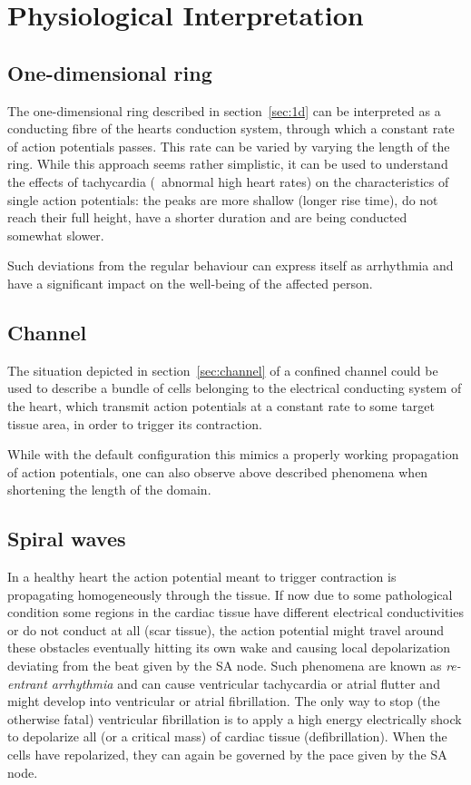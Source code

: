 \section{Physiological Interpretation}
\label{sec:phys}
\subsection{One-dimensional ring}
The one-dimensional ring described in section~\ref{sec:1d} can be interpreted
as a conducting fibre of the hearts conduction system, through which a constant
rate of action potentials passes. This rate can be varied by varying the length
of the ring. While this approach seems rather simplistic, it can be used to
understand the effects of tachycardia (\ie~abnormal high heart rates) on the
characteristics of single action potentials: the peaks are more shallow (longer
rise time), do not reach their full height, have a shorter duration and are
being conducted somewhat slower.

Such deviations from the regular behaviour can express itself as arrhythmia and
have a significant impact on the well-being of the affected person.


\subsection{Channel}
The situation depicted in section~\ref{sec:channel} of a confined channel could
be used to describe a bundle of cells belonging to the electrical conducting
system of the heart, which transmit action potentials at a constant rate to
some target tissue area, in order to trigger its contraction.

While with the default configuration this mimics a properly working propagation
of action potentials, one can also observe above described phenomena when
shortening the length of the domain.


\subsection{Spiral waves}
In a healthy heart the action potential meant to trigger contraction is
propagating homogeneously through the tissue. If now due to some pathological
condition some regions in the cardiac tissue have different electrical
conductivities or do not conduct at all (scar tissue), the action potential
might travel around these obstacles eventually hitting its own wake and causing
local depolarization deviating from the beat given by the SA node.
Such phenomena are known as \emph{re-entrant arrhythmia} and can cause ventricular tachycardia
or atrial flutter and might develop into ventricular or atrial fibrillation.
The only way to stop (the otherwise fatal) ventricular fibrillation is to
apply a high energy electrically shock to depolarize all (or a
critical mass) of cardiac tissue (defibrillation). When the cells have
repolarized, they can again be governed by the pace given by the SA node.

